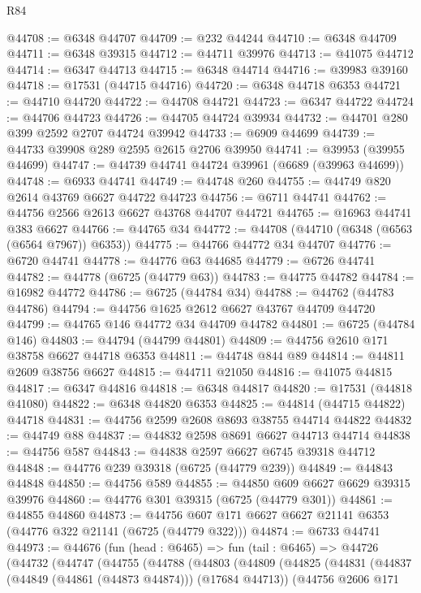 \begin{lexlean}{R84}
\begin{coremodule}
@44708 := @6348 @44707
@44709 := @232 @44244
@44710 := @6348 @44709
@44711 := @6348 @39315
@44712 := @44711 @39976
@44713 := @41075 @44712
@44714 := @6347 @44713
@44715 := @6348 @44714
@44716 := @39983 @39160
@44718 := @17531 (@44715 @44716)
@44720 := @6348 @44718 @6353
@44721 := @44710 @44720
@44722 := @44708 @44721
@44723 := @6347 @44722
@44724 := @44706 @44723
@44726 := @44705 @44724 @39934
@44732 := @44701 @280 @399 @2592 @2707 @44724 @39942
@44733 := @6909 @44699
@44739 := @44733 @39908 @289 @2595 @2615 @2706 @39950
@44741 := @39953 (@39955 @44699)
@44747 := @44739 @44741 @44724 @39961 (@6689 (@39963 @44699))
@44748 := @6933 @44741
@44749 := @44748 @260
@44755 := @44749 @820 @2614 @43769 @6627 @44722 @44723
@44756 := @6711 @44741
@44762 := @44756 @2566 @2613 @6627 @43768 @44707 @44721
@44765 := @16963 @44741 @383 @6627
@44766 := @44765 @34
@44772 := @44708 (@44710 (@6348 (@6563 (@6564 @7967)) @6353))
@44775 := @44766 @44772 @34 @44707
@44776 := @6720 @44741
@44778 := @44776 @63 @44685
@44779 := @6726 @44741
@44782 := @44778 (@6725 (@44779 @63))
@44783 := @44775 @44782
@44784 := @16982 @44772
@44786 := @6725 (@44784 @34)
@44788 := @44762 (@44783 @44786)
@44794 := @44756 @1625 @2612 @6627 @43767 @44709 @44720
@44799 := @44765 @146 @44772 @34 @44709 @44782
@44801 := @6725 (@44784 @146)
@44803 := @44794 (@44799 @44801)
@44809 := @44756 @2610 @171 @38758 @6627 @44718 @6353
@44811 := @44748 @844 @89
@44814 := @44811 @2609 @38756 @6627
@44815 := @44711 @21050
@44816 := @41075 @44815
@44817 := @6347 @44816
@44818 := @6348 @44817
@44820 := @17531 (@44818 @41080)
@44822 := @6348 @44820 @6353
@44825 := @44814 (@44715 @44822) @44718
@44831 := @44756 @2599 @2608 @8693 @38755 @44714 @44822
@44832 := @44749 @88
@44837 := @44832 @2598 @8691 @6627 @44713 @44714
@44838 := @44756 @587
@44843 := @44838 @2597 @6627 @6745 @39318 @44712
@44848 := @44776 @239 @39318 (@6725 (@44779 @239))
@44849 := @44843 @44848
@44850 := @44756 @589
@44855 := @44850 @609 @6627 @6629 @39315 @39976
@44860 := @44776 @301 @39315 (@6725 (@44779 @301))
@44861 := @44855 @44860
@44873 := @44756 @607 @171 @6627 @6627 @21141 @6353 (@44776 @322 @21141 (@6725 (@44779 @322)))
@44874 := @6733 @44741
@44973 := @44676
    (fun (head : @6465) =>
    fun (tail : @6465) =>
    @44726
      (@44732
        (@44747
          (@44755
            (@44788
              (@44803
                (@44809
                  (@44825
                    (@44831
                      (@44837 (@44849 (@44861 (@44873 @44874))) (@17684 @44713))
                      (@44756
                        @2606
                        @171

\end{coremodule}
\end{lexlean}
